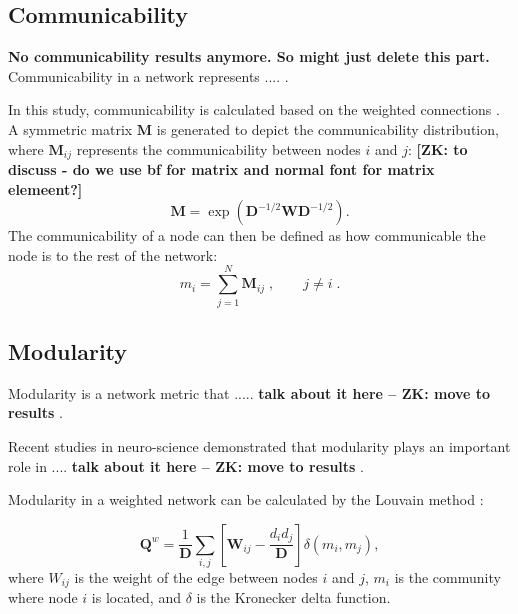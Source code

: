 \documentclass[fleqn,10pt,  reprint, amsmath,amssymb,aps, floatfix]{wlscirep}
\begin{document}
\subsection*{Communicability}

\textbf{No communicability results anymore. So might just delete this part.}
Communicability in a network represents .... \cite{Estrada2008}. 

In this study, communicability is calculated based on the weighted connections \cite{Crofts2009}. A symmetric matrix $\mathbf M$ is generated to depict the communicability distribution, where $\mathbf M_{ij}$ represents the communicability between nodes $i$ and $j$: \textbf{[ZK: to discuss - do we use bf for matrix and normal font for matrix elemeent?]}
\begin{equation}
\mathbf M = \exp{(\mathbf D^{-1/2} \mathbf W \mathbf D^{-1/2})}.
\end{equation} 
The communicability of a node can then be defined as how communicable the node is to the rest of the network:
\begin{equation}
	m_i = \sum \limits_{j = 1}^N \mathbf M_{ij} \;, \qquad j \neq i \; .
	\label{eq:ncomm}
\end{equation}



\subsection*{Modularity}
Modularity is a network metric that ..... \textbf{talk about it here -- ZK: move to results} \cite{Rubinov2009}.

Recent studies in neuro-science demonstrated that modularity plays an important role in .... \textbf{talk about it here -- ZK: move to results} \cite{Godwin2015}. 
 
Modularity in a weighted network can be calculated by the Louvain method \cite{Blondel2008}:
 
\begin{equation}
\mathbf Q^w = \frac{1}{\mathbf D} \sum \limits_{i,j} \left[\mathbf W_{ij} - \frac{d_i d_j}{\mathbf D} \right] \delta(m_i, m_j),
\label{eq:mod}
\end{equation}
where $W_{ij}$ is the weight of the edge between nodes $i$ and $j$, %
$m_i$ is the community where node $i$ is located, and $\delta$ is the Kronecker delta function.
\end{document}
